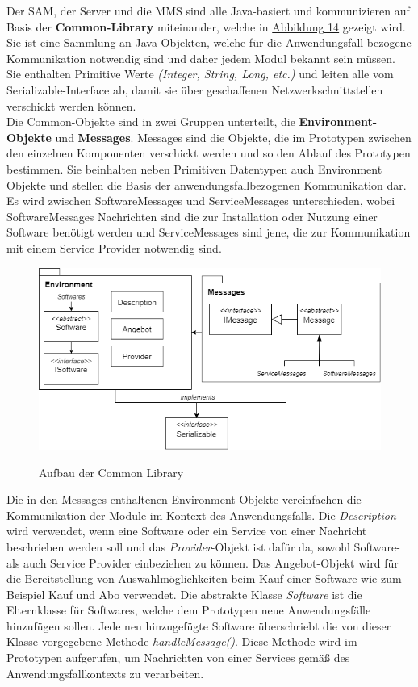 Der SAM, der Server und die MMS sind alle Java-basiert und kommunizieren auf Basis der \textbf{Common-Library} miteinander, welche in  \hyperref[img:common]{Abbildung 14} gezeigt wird. Sie ist eine Sammlung an Java-Objekten, welche für die Anwendungsfall-bezogene Kommunikation notwendig sind und daher jedem Modul bekannt sein müssen. Sie enthalten Primitive Werte \textit{(Integer, String, Long, etc.)} und leiten alle vom Serializable-Interface ab, damit sie über geschaffenen Netzwerkschnittstellen verschickt werden können. \\
Die Common-Objekte sind in zwei Gruppen unterteilt, die \textbf{Environment-Objekte} und \textbf{Messages}. Messages sind die Objekte, die im Prototypen zwischen den einzelnen Komponenten verschickt werden und so den Ablauf des Prototypen bestimmen. Sie beinhalten neben Primitiven Datentypen auch Environment Objekte und stellen die Basis der anwendungsfallbezogenen Kommunikation dar. Es wird zwischen SoftwareMessages und ServiceMessages unterschieden, wobei SoftwareMessages Nachrichten sind die zur Installation oder Nutzung einer Software benötigt werden und ServiceMessages sind jene, die zur Kommunikation mit einem Service Provider notwendig sind.
\begin{figure}[!h]
	\centering
	\includegraphics[width=0.8\columnwidth]{pictures/konzept-Common.png}
	\label{img:common}
	\caption{Aufbau der Common Library}
\end{figure}

Die in den Messages enthaltenen Environment-Objekte vereinfachen die Kommunikation der Module im Kontext des Anwendungsfalls. Die \textit{Description }wird verwendet, wenn eine Software oder ein Service von einer Nachricht beschrieben werden soll und das \textit{Provider}-Objekt ist dafür da, sowohl Software- als auch Service Provider einbeziehen zu können. Das Angebot-Objekt wird für die Bereitstellung von Auswahlmöglichkeiten beim Kauf einer Software wie zum Beispiel Kauf und Abo verwendet. Die abstrakte Klasse \textit{Software } ist die Elternklasse für Softwares, welche dem Prototypen neue Anwendungsfälle hinzufügen sollen. Jede neu hinzugefügte Software überschriebt die von dieser Klasse vorgegebene Methode \textit{handleMessage()}. Diese Methode wird im Prototypen aufgerufen, um Nachrichten von einer Services gemäß des Anwendungsfallkontexts zu verarbeiten. 

